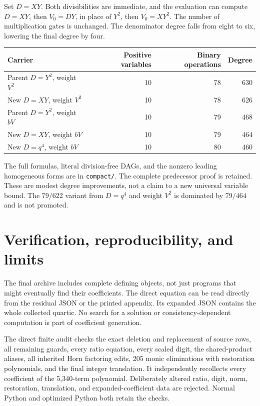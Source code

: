 \documentclass[11pt,letterpaper]{article}
\theoremstyle{remark}\newtheorem{remark}[theorem]{Remark}
\newcommand{\file}[1]{\nolinkurl{#1}}
\begin{document}
Set $D=XY$. Both divisibilities are immediate, and the evaluation can
compute $D=XY$, then $V_0=DY$, in place of $Y^2$, then $V_0=XY^2$.
The number of multiplication gates is unchanged. The denominator degree
falls from eight to six, lowering the final degree by four.

\begin{center}
\begin{tabular}{@{}lrrr@{}}
\toprule
Carrier & Positive variables & Binary operations & Degree\\
\midrule
Parent $D=Y^2$, weight $V^2$ & 10 & 78 & 630\\
New $D=XY$, weight $V^2$ & 10 & 78 & 626\\
Parent $D=Y^2$, weight $bV$ & 10 & 79 & 468\\
New $D=XY$, weight $bV$ & 10 & 79 & 464\\
New $D=q^4$, weight $bV$ & 10 & 80 & 460\\
\bottomrule
\end{tabular}
\end{center}

The full formulas, literal division-free DAGs, and the nonzero leading
homogeneous forms are in \file{compact/}. The complete predecessor proof
is retained. These are modest degree improvements, not a claim to a
new universal variable bound. The $79/622$ variant from $D=q^4$ and
weight $V^2$ is dominated by $79/464$ and is not promoted.



\section{Verification, reproducibility, and limits}\label{sec:verification}

The final archive includes complete defining objects, not just programs
that might eventually find their coefficients. The direct equation can
be read directly from the residual JSON or the printed appendix. Its
expanded JSON contains the whole collected quartic. No search for a
solution or consistency-dependent computation is part of coefficient
generation.

The direct finite audit checks the exact deletion and replacement of
source rows, all remaining guards, every ratio equation, every scaled
digit, the shared-product aliases, all inherited Horn factoring edits,
205 monic eliminations with restoration polynomials, and the final
integer translation. It independently recollects every coefficient of
the 5,340-term polynomial. Deliberately altered ratio, digit, norm,
restoration, translation, and expanded-coefficient data are rejected.
Normal Python and optimized Python both retain the checks.
\end{document}
